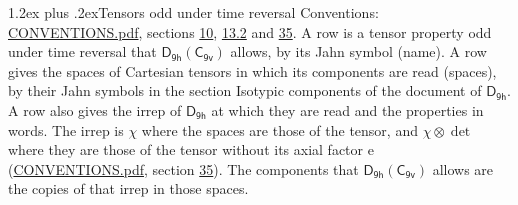 \documentclass[10pt,a4paper]{article}
\makeatletter
\renewcommand\section{\@startsection{section}{1}{\z@}{-3ex plus -1ex minus -.2ex}%
  {1.2ex plus .2ex}{\normalfont\large\sffamily\bfseries\color{parttitle}}}
\numberwithin{equation}{section}
\newcommand{\grp}[1]{\mathsf{#1}}
\newcommand{\irrprod}{\otimes}
\makeatother
\begin{document}
\section{Tensors odd under time reversal}\label{s:time_odd}
Conventions: \href{../../CONVENTIONS.pdf}{CONVENTIONS.pdf}, sections \href{../../../rotation/CONVENTIONS.pdf\#conv.10}{10}, \href{../../../rotation/CONVENTIONS.pdf\#conv.13.2}{13.2} and \href{../../CONVENTIONS.pdf\#conv.35}{35}.
\leavevmode\label{n:head.name.property}A row is a tensor property odd under time reversal that $\grp{D_{9h}}(\grp{C_{9v}})$ allows, by its Jahn symbol (name). \label{n:head.spaces}A row gives the spaces of Cartesian tensors in which its components are read (spaces), by their Jahn symbols in the section Isotypic components of the document of \href{../../../rotation/data/pdf/D9h.pdf}{$\grp{D_{9h}}$}. \label{n:head.properties}A row also gives the irrep of $\grp{D_{9h}}$ at which they are read and the properties in words. The irrep is $\chi$ where the spaces are those of the tensor, and $\chi \irrprod \det$ where they are those of the tensor without its axial factor e (\href{../../CONVENTIONS.pdf}{CONVENTIONS.pdf}, section \href{../../CONVENTIONS.pdf\#conv.35}{35}). The components that $\grp{D_{9h}}(\grp{C_{9v}})$ allows are the copies of that irrep in those spaces.
\end{document}
